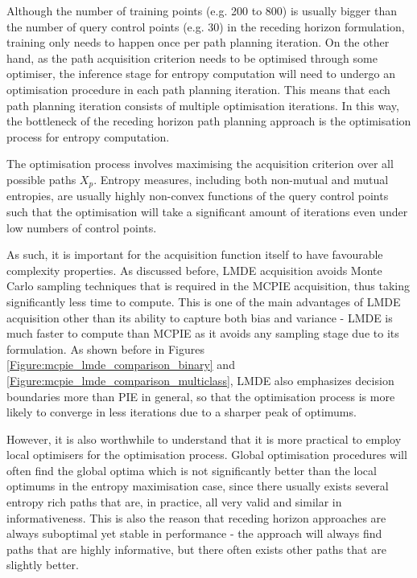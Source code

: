 			Although the number of training points (e.g. 200 to 800) is usually bigger than the number of query control points (e.g. 30) in the receding horizon formulation, training only needs to happen once per path planning iteration. On the other hand, as the path acquisition criterion needs to be optimised through some optimiser, the inference stage for entropy computation will need to undergo an optimisation procedure in each path planning iteration. This means that each path planning iteration consists of multiple optimisation iterations. In this way, the bottleneck of the receding horizon path planning approach is the optimisation process for entropy computation.
				
			The optimisation process involves maximising the acquisition criterion over all possible paths $X_{p}$. Entropy measures, including both non-mutual and mutual entropies, are usually highly non-convex functions of the query control points such that the optimisation will take a significant amount of iterations even under low numbers of control points.
			
			As such, it is important for the acquisition function itself to have favourable complexity properties. As discussed before, LMDE acquisition avoids Monte Carlo sampling techniques that is required in the MCPIE acquisition, thus taking significantly less time to compute. This is one of the main advantages of LMDE acquisition other than its ability to capture both bias and variance - LMDE is much faster to compute than MCPIE as it avoids any sampling stage due to its formulation. As shown before in Figures \ref{Figure:mcpie_lmde_comparison_binary} and \ref{Figure:mcpie_lmde_comparison_multiclass}, LMDE also emphasizes decision boundaries more than PIE in general, so that the optimisation process is more likely to converge in less iterations due to a sharper peak of optimums.
			
			However, it is also worthwhile to understand that it is more practical to employ local optimisers for the optimisation process. Global optimisation procedures will often find the global optima which is not significantly better than the local optimums in the entropy maximisation case, since there usually exists several entropy rich paths that are, in practice, all very valid and similar in informativeness. This is also the reason that receding horizon approaches are always suboptimal yet stable in performance - the approach will always find paths that are highly informative, but there often exists other paths that are slightly better.
						
